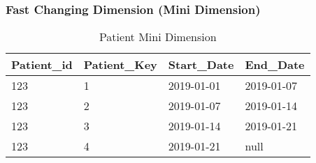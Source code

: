 \begin{frame}
	\frametitle{Fast Changing Dimension (Mini Dimension)}

\begin{table}
	\begin{adjustbox}{max width=.7\textwidth}
		\begin{tabular}{| l | l | l | l |}
			\hline
			Patient\_id & Patient\_Key & Start\_Date & End\_Date\\
			\hline
			\hline		
			123 & 1   & 2019-01-01 & 2019-01-07\\
			123 & 2   & 2019-01-07 & 2019-01-14\\
			123 & 3   & 2019-01-14 & 2019-01-21\\
			123 & 4   & 2019-01-21 & null\\
			\hline
		\end{tabular}
	\end{adjustbox}
	\caption{Patient Mini Dimension}
\end{table}

\end{frame}



